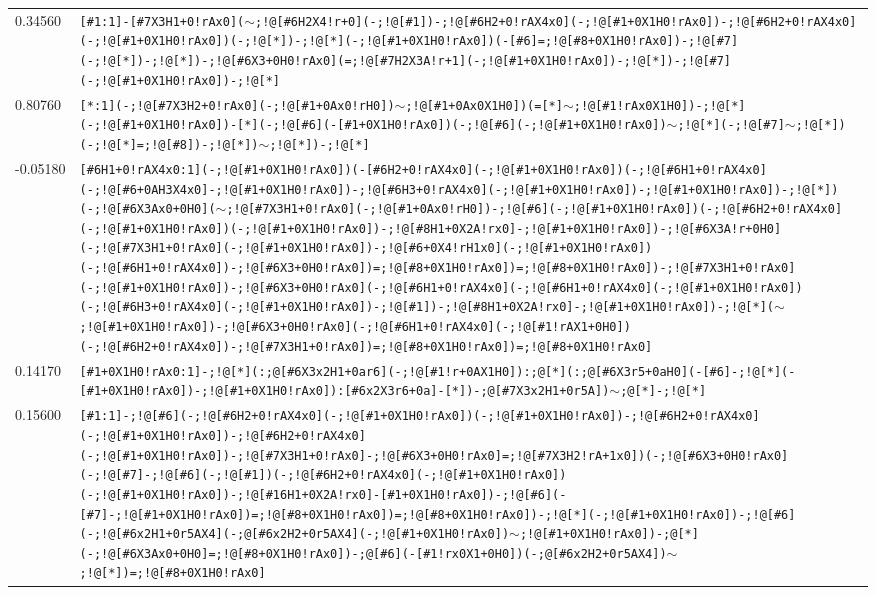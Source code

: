 \begin{longtable}{>{\baselineskip=10pt}p{} >{\baselineskip=10pt}p{}}
0.34560 & \texttt{[\#1:1]-[\#7X3H1+0!rAx0]($\sim$;!@[\#6H2X4!r+0](-;!@[\#1])-;!@[\#6H2+0!rAX4x0](-;!@[\#1+0X1H0!rAx0])-;!@[\#6H2+0!rAX4x0](-;!@[\#1+0X1H0!rAx0])(-;!@[*])-;!@[*](-;!@[\#1+0X1H0!rAx0])(-[\#6]=;!@[\#8+0X1H0!rAx0])-;!@[\#7](-;!@[*])-;!@[*])-;!@[\#6X3+0H0!rAx0](=;!@[\#7H2X3A!r+1](-;!@[\#1+0X1H0!rAx0])-;!@[*])-;!@[\#7](-;!@[\#1+0X1H0!rAx0])-;!@[*]} \\ 
0.80760 & \texttt{[*:1](-;!@[\#7X3H2+0!rAx0](-;!@[\#1+0Ax0!rH0])$\sim$;!@[\#1+0Ax0X1H0])(=[*]$\sim$;!@[\#1!rAx0X1H0])-;!@[*](-;!@[\#1+0X1H0!rAx0])-[*](-;!@[\#6](-[\#1+0X1H0!rAx0])(-;!@[\#6](-;!@[\#1+0X1H0!rAx0])$\sim$;!@[*](-;!@[\#7]$\sim$;!@[*])(-;!@[*]=;!@[\#8])-;!@[*])$\sim$;!@[*])-;!@[*]} \\ 
-0.05180 & \texttt{[\#6H1+0!rAX4x0:1](-;!@[\#1+0X1H0!rAx0])(-[\#6H2+0!rAX4x0](-;!@[\#1+0X1H0!rAx0])(-;!@[\#6H1+0!rAX4x0](-;!@[\#6+0AH3X4x0]-;!@[\#1+0X1H0!rAx0])-;!@[\#6H3+0!rAX4x0](-;!@[\#1+0X1H0!rAx0])-;!@[\#1+0X1H0!rAx0])-;!@[*])(-;!@[\#6X3Ax0+0H0]($\sim$;!@[\#7X3H1+0!rAx0](-;!@[\#1+0Ax0!rH0])-;!@[\#6](-;!@[\#1+0X1H0!rAx0])(-;!@[\#6H2+0!rAX4x0](-;!@[\#1+0X1H0!rAx0])(-;!@[\#1+0X1H0!rAx0])-;!@[\#8H1+0X2A!rx0]-;!@[\#1+0X1H0!rAx0])-;!@[\#6X3A!r+0H0](-;!@[\#7X3H1+0!rAx0](-;!@[\#1+0X1H0!rAx0])-;!@[\#6+0X4!rH1x0](-;!@[\#1+0X1H0!rAx0])(-;!@[\#6H1+0!rAX4x0])-;!@[\#6X3+0H0!rAx0])=;!@[\#8+0X1H0!rAx0])=;!@[\#8+0X1H0!rAx0])-;!@[\#7X3H1+0!rAx0](-;!@[\#1+0X1H0!rAx0])-;!@[\#6X3+0H0!rAx0](-;!@[\#6H1+0!rAX4x0](-;!@[\#6H1+0!rAX4x0](-;!@[\#1+0X1H0!rAx0])(-;!@[\#6H3+0!rAX4x0](-;!@[\#1+0X1H0!rAx0])-;!@[\#1])-;!@[\#8H1+0X2A!rx0]-;!@[\#1+0X1H0!rAx0])-;!@[*]($\sim$;!@[\#1+0X1H0!rAx0])-;!@[\#6X3+0H0!rAx0](-;!@[\#6H1+0!rAX4x0](-;!@[\#1!rAX1+0H0])(-;!@[\#6H2+0!rAX4x0])-;!@[\#7X3H1+0!rAx0])=;!@[\#8+0X1H0!rAx0])=;!@[\#8+0X1H0!rAx0]} \\ 
0.14170 & \texttt{[\#1+0X1H0!rAx0:1]-;!@[*](:;@[\#6X3x2H1+0ar6](-;!@[\#1!r+0AX1H0]):;@[*](:;@[\#6X3r5+0aH0](-[\#6]-;!@[*](-[\#1+0X1H0!rAx0])-;!@[\#1+0X1H0!rAx0]):[\#6x2X3r6+0a]-[*])-;@[\#7X3x2H1+0r5A])$\sim$;@[*]-;!@[*]} \\ 
0.15600 & \texttt{[\#1:1]-;!@[\#6](-;!@[\#6H2+0!rAX4x0](-;!@[\#1+0X1H0!rAx0])(-;!@[\#1+0X1H0!rAx0])-;!@[\#6H2+0!rAX4x0](-;!@[\#1+0X1H0!rAx0])-;!@[\#6H2+0!rAX4x0](-;!@[\#1+0X1H0!rAx0])-;!@[\#7X3H1+0!rAx0]-;!@[\#6X3+0H0!rAx0]=;!@[\#7X3H2!rA+1x0])(-;!@[\#6X3+0H0!rAx0](-;!@[\#7]-;!@[\#6](-;!@[\#1])(-;!@[\#6H2+0!rAX4x0](-;!@[\#1+0X1H0!rAx0])(-;!@[\#1+0X1H0!rAx0])-;!@[\#16H1+0X2A!rx0]-[\#1+0X1H0!rAx0])-;!@[\#6](-[\#7]-;!@[\#1+0X1H0!rAx0])=;!@[\#8+0X1H0!rAx0])=;!@[\#8+0X1H0!rAx0])-;!@[*](-;!@[\#1+0X1H0!rAx0])-;!@[\#6](-;!@[\#6x2H1+0r5AX4](-;@[\#6x2H2+0r5AX4](-;!@[\#1+0X1H0!rAx0])$\sim$;!@[\#1+0X1H0!rAx0])-;@[*](-;!@[\#6X3Ax0+0H0]=;!@[\#8+0X1H0!rAx0])-;@[\#6](-[\#1!rx0X1+0H0])(-;@[\#6x2H2+0r5AX4])$\sim$;!@[*])=;!@[\#8+0X1H0!rAx0]} \\ 

\end{longtable}
